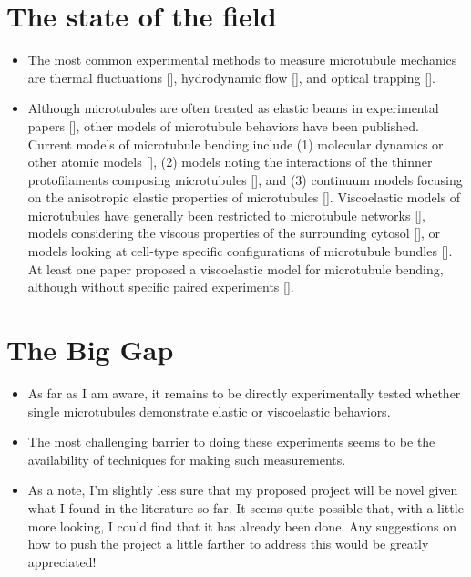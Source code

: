 \section{The state of the field}
\begin{itemize}
    \item The most common experimental methods to measure microtubule mechanics are thermal fluctuations [\cite{p_thermal-flex, p_therm-flex-2}], hydrodynamic flow [\cite{p_flow-1}], and optical trapping [\cite{p_trap-1, p_trap-2}].
    \item Although microtubules are often treated as elastic beams in experimental papers [\cite{rev_mechanics}], other models of microtubule behaviors have been published. Current models of microtubule bending include (1) molecular dynamics or other atomic models [\cite{p_Molec-Dyn-1, p_atomic-1}], (2) models noting the interactions of the thinner protofilaments composing microtubules [\cite{p_protofil-1, p_protofil-2}], and (3) continuum models focusing on the anisotropic elastic properties of microtubules [\cite{p_aniso-2, p_aniso-3, p_aniso-4}]. Viscoelastic models of microtubules have generally been restricted to microtubule networks [\cite{rev_visco, p_visco-network}], models considering the viscous properties of the surrounding cytosol [\cite{p_visco-cytosol}], or models looking at cell-type specific configurations of microtubule bundles [\cite{p_visco-bundle, p_visco-myocyte}]. At least one paper proposed a viscoelastic model for microtubule bending, although without specific paired experiments [\cite{p_visco-model}].
\end{itemize}

\section{The Big Gap}
\begin{itemize}
    \item As far as I am aware, it remains to be directly experimentally tested whether single microtubules demonstrate elastic or viscoelastic behaviors.
    \item The most challenging barrier to doing these experiments seems to be the availability of techniques for making such measurements.
    \item As a note, I'm slightly less sure that my proposed project will be novel given what I found in the literature so far. It seems quite possible that, with a little more looking, I could find that it has already been done. Any suggestions on how to push the project a little farther to address this would be greatly appreciated!
\end{itemize}

